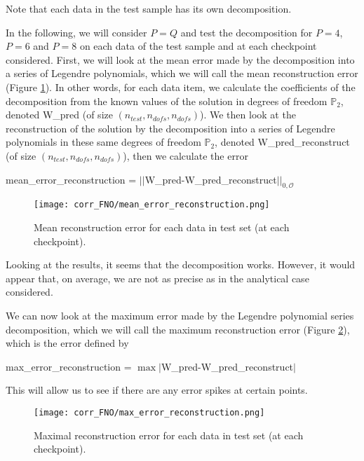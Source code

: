 \begin{Rem}
	Note that each data in the test sample has its own decomposition.
\end{Rem}

In the following, we will consider $P=Q$ and test the decomposition for $P=4$, $P=6$ and $P=8$ on each data of the test sample and at each checkpoint considered. First, we will look at the mean error made by the decomposition into a series of Legendre polynomials, which we will call the mean reconstruction error (Figure \ref{mean_error_reconstruction}). In other words, for each data item, we calculate the coefficients of the decomposition from the known values of the solution in degrees of freedom $\mathbb{P}_2$, denoted W\_pred (of size $(n_{test},n_{dofs},n_{dofs})$). We then look at the reconstruction of the solution by the decomposition into a series of Legendre polynomials in these same degrees of freedom $\mathbb{P}_2$, denoted W\_pred\_reconstruct (of size $(n_{test},n_{dofs},n_{dofs})$), then we calculate the error
\begin{center}
	 mean\_error\_reconstruction = $||$W\_pred-W\_pred\_reconstruct$||_{0,\mathcal{O}}$
\end{center}

\begin{figure}[H]
	\centering
	\texttt{[image: corr\_FNO/mean\_error\_reconstruction.png]}
	\caption{Mean reconstruction error for each data in test set (at each checkpoint).}
	\label{mean_error_reconstruction}
\end{figure} 

Looking at the results, it seems that the decomposition works. However, it would appear that, on average, we are not as precise as in the analytical case considered.

We can now look at the maximum error made by the Legendre polynomial series decomposition, which we will call the maximum reconstruction error (Figure \ref{max_error_reconstruction}), which is the error defined by
\begin{center}
	max\_error\_reconstruction = $\max|$W\_pred-W\_pred\_reconstruct$|$
\end{center}
This will allow us to see if there are any error spikes at certain points.

\begin{figure}[H]
	\centering
	\texttt{[image: corr\_FNO/max\_error\_reconstruction.png]}
	\caption{Maximal reconstruction error for each data in test set (at each checkpoint).}
	\label{max_error_reconstruction}
\end{figure} 

